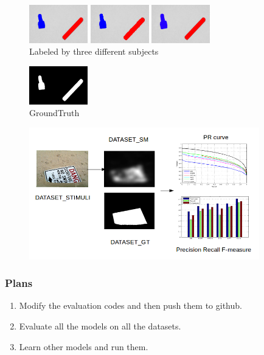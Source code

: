 \documentclass[notheorems,mathserif,table,compress]{beamer}  %
\begin{document}
\begin{frame}
  \begin{figure}[!ht]
  \begin{minipage}[t]{0.3\textwidth}
  \centering
  \includegraphics[width=1in]{cropped_15.png}
  \end{minipage}
  \begin{minipage}[t]{0.3\textwidth}
  \centering
  \includegraphics[width=1in]{cropped_29.png}
  \end{minipage}
  \begin{minipage}[t]{0.3\textwidth}
  \centering
  \includegraphics[width=1in]{cropped_31.png}
  \end{minipage}
  \caption{Labeled by three different subjects}
  \end{figure} 
  
  \begin{figure}[h]
  \centering
  \centerline{\includegraphics[width=1in]{cropped.png}}
  \caption{GroundTruth}
  \end{figure}
\end{frame}


\begin{frame}
  \begin{figure}[h]
  \centering
  \centerline{\includegraphics[width=10cm]{img.png}}
  \end{figure}
\end{frame}


\begin{frame}
  \frametitle{Plans}
\begin{enumerate}
  \item Modify the evaluation codes and then push them to github.
  \item Evaluate all the models on all the datasets.
  \item Learn other models and run them.
\end{enumerate}
\end{frame}
\end{document}
